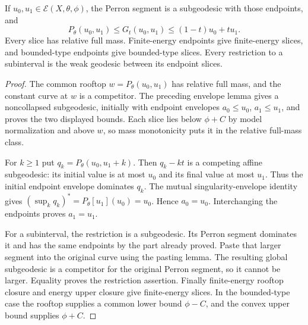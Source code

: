 \begin{theorem}\label{thm:relative-full-mass-perron-geodesic}
If $u_0,u_1\in\mathcal E(X,\theta,\phi)$, the Perron segment is a subgeodesic with those endpoints, and
\[
 P_\theta(u_0,u_1)\leq G_t(u_0,u_1)
                         \leq(1-t)u_0+tu_1.
\]
Every slice has relative full mass. Finite-energy endpoints give finite-energy slices, and bounded-type endpoints give bounded-type slices. Every restriction to a subinterval is the weak geodesic between its endpoint slices.
\end{theorem}
\begin{proof}
The common rooftop $w=P_\theta(u_0,u_1)$ has relative full mass, and the constant curve at $w$ is a competitor. The preceding envelope lemma gives a noncollapsed subgeodesic, initially with endpoint envelopes $a_0\leq u_0$, $a_1\leq u_1$, and proves the two displayed bounds. Each slice lies below $\phi+C$ by model normalization and above $w$, so mass monotonicity puts it in the relative full-mass class.

For $k\geq1$ put $q_k=P_\theta(u_0,u_1+k)$. Then $q_k-kt$ is a competing affine subgeodesic: its initial value is at most $u_0$ and its final value at most $u_1$. Thus the initial endpoint envelope dominates $q_k$. The mutual singularity-envelope identity gives $(\sup_kq_k)^*=P_\theta[u_1](u_0)=u_0$. Hence $a_0=u_0$. Interchanging the endpoints proves $a_1=u_1$.

For a subinterval, the restriction is a subgeodesic. Its Perron segment dominates it and has the same endpoints by the part already proved. Paste that larger segment into the original curve using the pasting lemma. The resulting global subgeodesic is a competitor for the original Perron segment, so it cannot be larger. Equality proves the restriction assertion. Finally finite-energy rooftop closure and energy upper closure give finite-energy slices. In the bounded-type case the rooftop supplies a common lower bound $\phi-C$, and the convex upper bound supplies $\phi+C$.
\end{proof}

